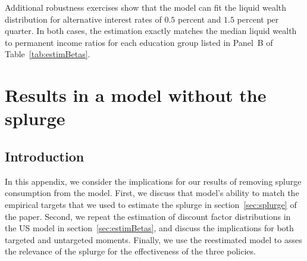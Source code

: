 \documentclass[\latexroot/\projectname]{subfiles}
\begin{document}

\whenstandalone{%
  \setcounter{section}{1}  %
}

Additional robustness exercises show that the model can fit the liquid wealth distribution for alternative interest rates of $0.5$ percent and $1.5$ percent per quarter. In both cases, the estimation exactly matches the median liquid wealth to permanent income ratios for each education group listed in Panel~B of Table~\ref{tab:estimBetas}.
\section{Results in a model without the splurge}
\whenintegrated{\label{app:Model-without-splurge}} 

\subsection{Introduction}
\whenintegrated{\label{app:Model-without-splurge-intro}} 

In this appendix, we consider the implications for our results of removing splurge consumption from the model. First, we discuss that model's ability to match the empirical targets that we used to estimate the splurge in section~\ref{sec:splurge} of the paper. Second, we repeat the estimation of discount factor distributions in the US model in section~\ref{sec:estimBetas}, and discuss the implications for both targeted and untargeted moments. Finally, we use the reestimated model to asses the relevance of the splurge for the effectiveness of the three policies.
\end{document}
